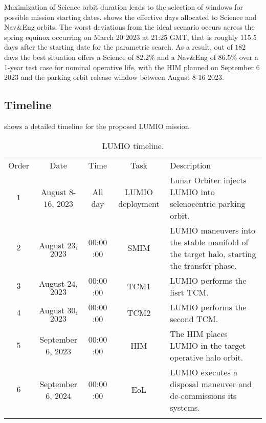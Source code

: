 Maximization of Science orbit duration leads to the selection of windows for possible mission starting dates.  shows the effective days allocated to Science and Nav\&Eng orbits. The worst deviations from the ideal scenario occurs across the spring equinox occurring on March $20$ $2023$ at $21$:$25$ GMT, that is roughly $115.5$ days after the starting date for the parametric search. As a result, out of $182$ days the best situation offers a Science of $82.2\%$ and a Nav\&Eng of $86.5\%$ over a 1-year test case for nominal operative life, with the {HIM} planned on September $6$ $2023$ and the parking orbit release window between August $8$-$16$ 2023. 


\newpage
\subsection{Timeline}
 shows a detailed timeline for the proposed LUMIO mission.
%
\begin{table}[h!]
	\caption{LUMIO timeline.}
	\label{tab:Timeline}
	\centering
	\small
	\begin{tabularx}{\textwidth}{ccccX}
		\TOPlines
		Order & Date & Time & Task & Description \\
		\MIDline
		$1$ & August $8$-$16$, $2023$ & All day & LUMIO deployment & Lunar Orbiter injects LUMIO into selenocentric parking orbit. \\
		$2$ & August $23$, $2023$ & $00$:$00$:$00$ & {SMIM} & LUMIO maneuvers into the stable manifold of the target halo, starting the transfer phase. \\
		$3$ & August $24$, $2023$ & $00$:$00$:$00$ & TCM1 & LUMIO performs the fisrt {TCM}. \\
		$4$ & August $30$, $2023$ & $00$:$00$:$00$ & TCM2 & LUMIO performs the second {TCM}. \\
		$5$ & September $6$, $2023$ & $00$:$00$:$00$ & {HIM} & The {HIM} places LUMIO in the target operative halo orbit. \\
		$6$ & September $6$, $2024$ & $00$:$00$:$00$ & {EoL} & LUMIO executes a disposal maneuver and de-commissions its systems. \\
		\BOTTOMlines
	\end{tabularx}
\end{table}
%
